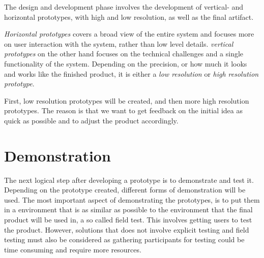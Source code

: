 \documentclass{report}
\begin{document}
The design and development phase involves the development of vertical- and horizontal prototypes, with high and low resolution, as well as the final artifact. 

\textit{Horizontal prototypes} covers a broad view of the entire system and focuses more on user interaction with the system, rather than low level details. \textit{vertical prototypes} on the other hand focuses on the technical challenges and a single functionality of the system. Depending on the precision, or how much it looks and works like the finished product, it is either a \textit{low resolution} or \textit{high resolution prototype}. 

First, low resolution prototypes will be created, and then more high resolution prototypes. The reason is that we want to get feedback on the initial idea as quick as possible and to adjust the product accordingly.






 
 
\section{Demonstration}

The next logical step after developing a prototype is to demonstrate and test it. Depending on the prototype created, different forms of demonstration will be used. The most important aspect of demonstrating the prototypes, is to put them in a environment that is as similar as possible to the environment that the final product will be used in, a so called field test. This involves getting users to test the product. However, solutions that does not involve explicit testing and field testing must also be considered as gathering participants for testing could be time consuming and require more resources.  
 
\end{document}
